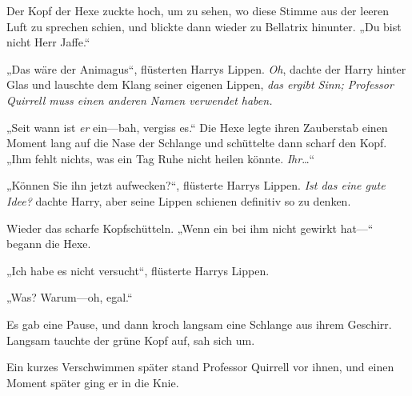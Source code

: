 Der Kopf der Hexe zuckte hoch, um zu sehen, wo diese Stimme aus der leeren Luft zu sprechen schien, und blickte dann wieder zu Bellatrix hinunter. „Du bist nicht Herr Jaffe.“

„Das wäre der Animagus“, flüsterten Harrys Lippen. \emph{Oh}, dachte der Harry hinter Glas und lauschte dem Klang seiner eigenen Lippen, \emph{das ergibt Sinn; Professor Quirrell muss einen anderen Namen verwendet haben.}

„Seit wann ist \emph{er} ein—bah, vergiss es.“ Die Hexe legte ihren Zauberstab einen Moment lang auf die Nase der Schlange und schüttelte dann scharf den Kopf. „Ihm fehlt nichts, was ein Tag Ruhe nicht heilen könnte. \emph{Ihr}…“

„Können Sie ihn jetzt aufwecken?“, flüsterte Harrys Lippen. \emph{Ist das eine gute Idee?} dachte Harry, aber seine Lippen schienen definitiv so zu denken.

Wieder das scharfe Kopfschütteln. „Wenn ein  bei ihm nicht gewirkt hat—“ begann die Hexe.

„Ich habe es nicht versucht“, flüsterte Harrys Lippen.

„Was? Warum—oh, egal.“ 

Es gab eine Pause, und dann kroch langsam eine Schlange aus ihrem Geschirr. Langsam tauchte der grüne Kopf auf, sah sich um.

Ein kurzes Verschwimmen später stand Professor Quirrell vor ihnen, und einen Moment später ging er in die Knie.

